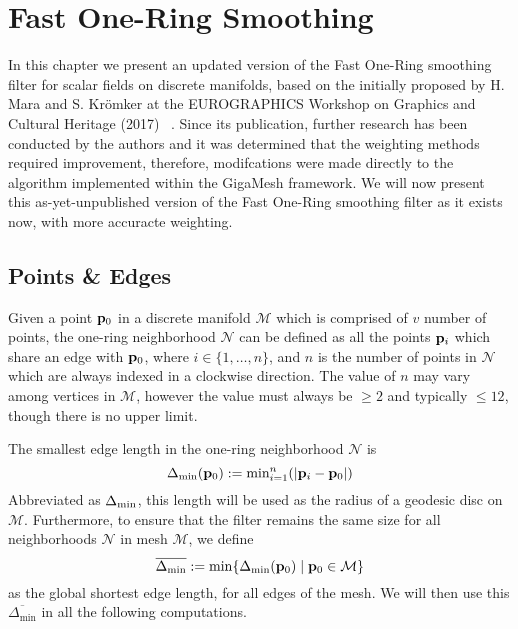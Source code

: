 \chapter{Fast One-Ring Smoothing}
In this chapter we present an updated version of the Fast One-Ring smoothing filter for scalar fields on discrete manifolds, based on the initially proposed by H. Mara and S. Krömker at the EUROGRAPHICS Workshop on Graphics and Cultural Heritage (2017) ~\cite[s.~3.2]{Mara17}. Since its publication, further research has been conducted by the authors and it was determined that the weighting methods required improvement, therefore, modifcations were made directly to the algorithm implemented within the GigaMesh \todoCitation framework. We will now present this as-yet-unpublished version of the Fast One-Ring smoothing filter as it exists now, with more accuracte weighting.
%
\section{Points \& Edges}
Given a point $\mathbf{p}_0$ in a discrete manifold $\mathcal{M}$ which is comprised of $v$ number of points, the one-ring neighborhood $\mathcal{N}$ can be defined as all the points $\mathbf{p}_i$ which share an edge with $\mathbf{p}_0$, where $i \in \{1, \ldots, n\}$, and $n$ is the number of points in $\mathcal{N}$ which are always indexed in a clockwise direction. The value of $n$ may vary among vertices in $\mathcal{M}$, however the value must always be $\geq 2$ and typically $\leq 12$, though there is no upper limit.%
%
%
%
%
%
%
%

The smallest edge length in the one-ring neighborhood $\mathcal{N}$ is 
\begin{equation}
	\Delta_\text{min}(\mathbf{p}_0) := \text{min}^n_{i=1} (|\mathbf{p}_i - \mathbf{p}_0|)
	\label{eq:localMinimumEdgeLength}
\end{equation}
Abbreviated as $\Delta_\text{min}$, this length will be used as the radius of a geodesic disc on $\mathcal{M}$.  Furthermore, to ensure that the filter remains the same size for all neighborhoods $\mathcal{N}$ in mesh $\mathcal{M}$, we define
\begin{equation}
	\overline{\Delta_\text{min}} := \min\{\Delta_\text{min}(\mathbf{p}_0) \;|\; \mathbf{p}_0 \in \mathcal{M}\}
	\label{eq:globalMinimumEdgeLength}
\end{equation} 
as the global shortest edge length, for all edges of the mesh. We will then use this $\overline{\Delta_\text{min}}$ in all the following computations. 

